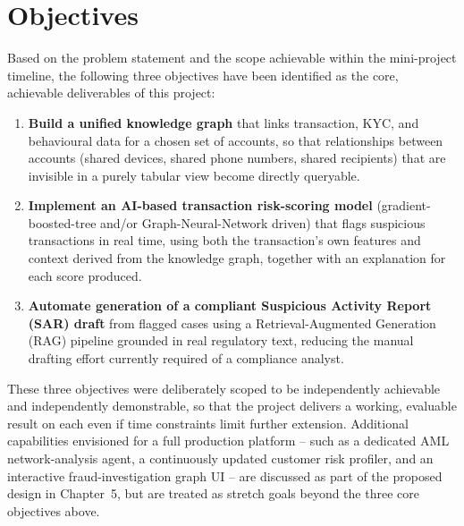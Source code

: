 \chapter{Objectives}

Based on the problem statement and the scope achievable within the mini-project timeline, the following three objectives have been identified as the core, achievable deliverables of this project:

\begin{enumerate}
    \item \textbf{Build a unified knowledge graph} that links transaction, KYC, and behavioural data for a chosen set of accounts, so that relationships between accounts (shared devices, shared phone numbers, shared recipients) that are invisible in a purely tabular view become directly queryable.
    \item \textbf{Implement an AI-based transaction risk-scoring model} (gradient-boosted-tree and/or Graph-Neural-Network driven) that flags suspicious transactions in real time, using both the transaction's own features and context derived from the knowledge graph, together with an explanation for each score produced.
    \item \textbf{Automate generation of a compliant Suspicious Activity Report (SAR) draft} from flagged cases using a Retrieval-Augmented Generation (RAG) pipeline grounded in real regulatory text, reducing the manual drafting effort currently required of a compliance analyst.
\end{enumerate}

These three objectives were deliberately scoped to be independently achievable and independently demonstrable, so that the project delivers a working, evaluable result on each even if time constraints limit further extension. Additional capabilities envisioned for a full production platform -- such as a dedicated AML network-analysis agent, a continuously updated customer risk profiler, and an interactive fraud-investigation graph UI -- are discussed as part of the proposed design in Chapter~5, but are treated as stretch goals beyond the three core objectives above.
